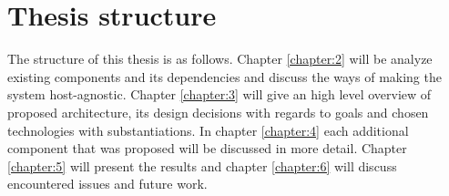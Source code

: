 \section{Thesis structure}
The structure of this thesis is as follows. Chapter \ref{chapter:2} will be analyze existing components and its dependencies and discuss the ways of making the system host-agnostic. Chapter \ref{chapter:3} will give an high level overview of proposed architecture, its design decisions with regards to goals and chosen technologies with substantiations. In chapter \ref{chapter:4} each additional component that was proposed will be discussed in more detail. Chapter \ref{chapter:5} will present the results and chapter \ref{chapter:6} will discuss encountered issues and future work.